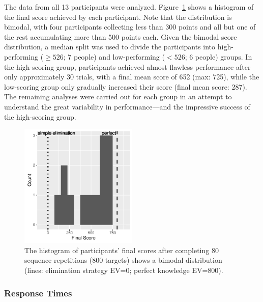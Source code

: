 \documentclass[man,floatsintext]{apa6}
\begin{document}
The data from all 13 participants were analyzed. Figure~\ref{fig:score-hist} shows a histogram of the final score achieved by each participant. Note that the distribution is bimodal, with four participants collecting less than 300 points and all but one of the rest accumulating more than 500 points each. Given the bimodal score distribution, a median split was used to divide the participants into high-performing ($\geq526$; 7 people) and low-performing ($<526$; 6 people) groups. In the high-scoring group, participants achieved almost flawless performance after only approximately 30 trials, with a final mean score of 652 (max: 725), while the low-scoring group only gradually increased their score (final mean score: 287). The remaining analyses were carried out for each group in an attempt to understand the great variability in performance---and the impressive success of the high-scoring group.

\begin{figure}[h]
  \centering
  \includegraphics[width=0.5\textwidth]{figures/hum_hist_final_score}
  \caption{The histogram of participants' final scores after completing 80 sequence repetitions (800 targets) shows a bimodal distribution (lines: elimination strategy EV=0; perfect knowledge EV=800).}
  \label{fig:score-hist}
\end{figure}
\vspace{-.1cm}

\subsubsection{Response Times}
\end{document}
